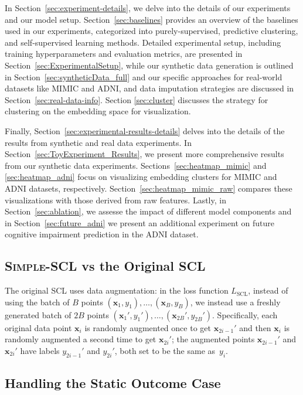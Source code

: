 \documentclass[pmlr,twocolumn,10pt]{jmlr} %
\begin{document}
In Section~\ref{sec:experiment-details}, we delve into the details of our experiments and our model setup. Section~\ref{sec:baselines} provides an overview of the baselines used in our experiments, categorized into purely-supervised, predictive clustering, and self-supervised learning methods. 
Detailed experimental setup, including training hyperparameters and evaluation metrics, are presented in Section~\ref{sec:ExperimentalSetup}, while our synthetic data generation is outlined in Section~\ref{sec:syntheticData_full} and our specific approaches for real-world datasets like MIMIC and ADNI, and data imputation strategies are discussed in Section~\ref{sec:real-data-info}. Section \ref{sec:cluster} discusses the strategy for clustering on the embedding space for visualization. 

Finally, Section~\ref{sec:experimental-results-details} delves into the details of the results from synthetic and real data experiments.
In Section~\ref{sec:ToyExperiment_Results}, we present more comprehensive results from our synthetic data experiments. Sections~\ref{sec:heatmap_mimic} and \ref{sec:heatmap_adni} focus on visualizing embedding clusters for MIMIC and ADNI datasets, respectively. Section~\ref{sec:heatmap_mimic_raw} compares these visualizations with those derived from raw features. Lastly, in Section~\ref{sec:ablation}, we assesse the impact of different model components and in Section~\ref{sec:future_adni} we present an additional experiment on future cognitive impairment prediction in the ADNI dataset.

\subsection{\textsc{Simple-SCL} vs the Original SCL}
\label{sec:relating-to-original-SCL}
The original SCL uses data augmentation: in the loss function $L_{\text{SCL}}$, instead of using the batch of $B$ points $(\mathbf{x}_1,y_1),\dots,(\mathbf{x}_B,y_B)$, we instead use a freshly generated batch of $2B$ points $(\mathbf{x}_1',y_1'),\dots,(\mathbf{x}_{2B}',y_{2B}')$. Specifically, each original data point $\mathbf{x}_i$ is randomly augmented once to get $\mathbf{x}_{2i-1}'$ and then $\mathbf{x}_i$ is randomly augmented a second time to get $\mathbf{x}_{2i}'$; the augmented points $\mathbf{x}_{2i-1}'$ and $\mathbf{x}_{2i}'$ have labels $y_{2i-1}'$ and $y_{2i}'$, both set to be the same as~$y_i$.

\subsection{Handling the Static Outcome Case}
\label{sec:handling-static-outcome}
\end{document}
